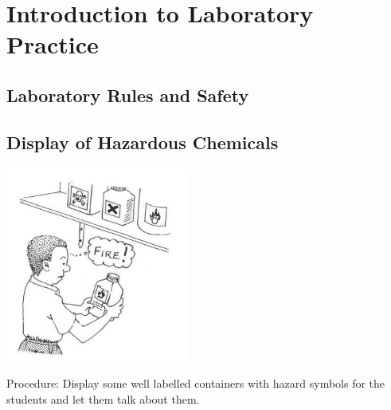 \section{Introduction to Laboratory Practice}

\begin{multicols}{2}



\section*{Laboratory Rules and Safety}


\subsection{Display of Hazardous Chemicals}

\begin{center}
\includegraphics[width=0.45\textwidth]{./img/source/display-chemicals.jpg}
\end{center}

\begin{description*}
\item[Procedure:]{Display some well labelled containers with
hazard symbols for the students and let them
talk about them.}
\end{description*}


\end{multicols}
